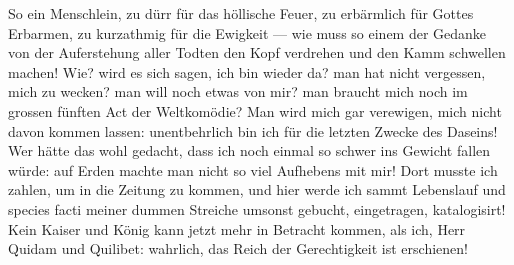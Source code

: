 So ein Menschlein, zu dürr für das höllische Feuer, zu erbärmlich für Gottes Erbarmen, zu kurzathmig für die Ewigkeit — wie muss so einem  der Gedanke von der Auferstehung aller Todten den Kopf verdrehen und den Kamm schwellen machen! Wie? wird es sich sagen, ich bin wieder da? man hat nicht vergessen, mich zu wecken? man will noch etwas von mir? man braucht mich noch im grossen fünften Act der Weltkomödie? Man wird mich gar verewigen, mich nicht davon kommen lassen: unentbehrlich bin ich für die letzten Zwecke des Daseins! Wer hätte das wohl gedacht, dass ich noch einmal so schwer ins Gewicht fallen würde: auf Erden machte man nicht so viel Aufhebens mit mir! Dort musste ich zahlen, um in die Zeitung zu kommen, und hier werde ich sammt Lebenslauf und species facti meiner dummen Streiche umsonst gebucht, eingetragen, katalogisirt! Kein Kaiser und König kann jetzt mehr in Betracht kommen, als ich, Herr Quidam und Quilibet: wahrlich, das Reich der Gerechtigkeit ist erschienen!
\par

